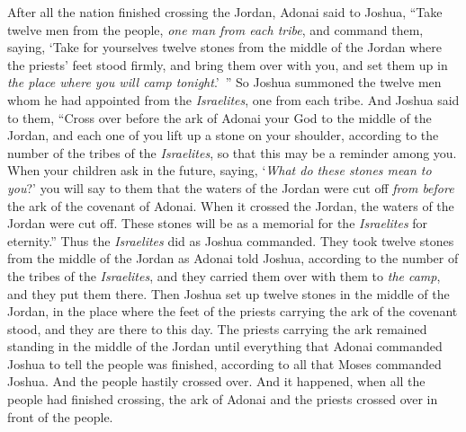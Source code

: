 \begin{biblechapter} %
 After all the nation finished crossing the Jordan, Adonai said to Joshua,
\verse “Take twelve men from the people, \textit{one man from each tribe},
\verse and command them, saying, ‘Take for yourselves twelve stones from the middle of the Jordan where the priests’ feet stood firmly, and bring them over with you, and set them up in \textit{the place where you will camp tonight}.’ ”
\verse So Joshua summoned the twelve men whom he had appointed from the \textit{Israelites}, one from each tribe.
\verse And Joshua said to them, “Cross over before the ark of Adonai your God to the middle of the Jordan, and each one of you lift up a stone on your shoulder, according to the number of the tribes of the \textit{Israelites},
\verse so that this may be a reminder among you. When your children ask in the future, saying, ‘\textit{What do these stones mean to you}?’
\verse you will say to them that the waters of the Jordan were cut off \textit{from before} the ark of the covenant of Adonai. When it crossed the Jordan, the waters of the Jordan were cut off. These stones will be as a memorial for the \textit{Israelites} for eternity.”
\verse Thus the \textit{Israelites} did as Joshua commanded. They took twelve stones from the middle of the Jordan as Adonai told Joshua, according to the number of the tribes of the \textit{Israelites}, and they carried them over with them to \textit{the camp}, and they put them there.
\verse Then Joshua set up twelve stones in the middle of the Jordan, in the place where the feet of the priests carrying the ark of the covenant stood, and they are there to this day.
\verse The priests carrying the ark remained standing in the middle of the Jordan until everything that Adonai commanded Joshua to tell the people was finished, according to all that Moses commanded Joshua. And the people hastily crossed over.
\verse And it happened, when all the people had finished crossing, the ark of Adonai and the priests crossed over in front of the people.

\end{biblechapter}
